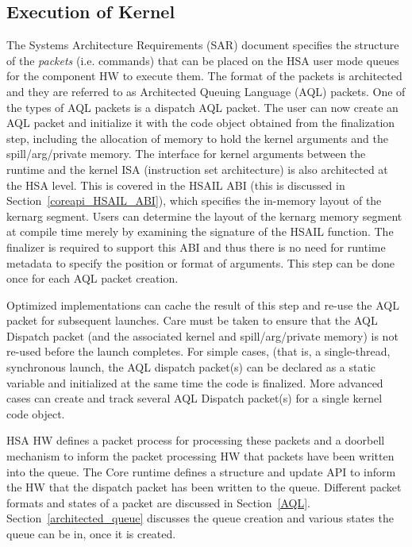 \documentclass{book}
\begin{document}
\subsection{Execution of Kernel}
The Systems Architecture Requirements (SAR) document specifies the
structure of the \emph{packets} (i.e. commands) that can be placed on
the HSA user mode queues for the component HW to execute them. The
format of the packets is architected and they are referred to as
Architected Queuing Language (AQL) packets. One of the types of AQL
packets is a dispatch AQL packet.
The user can now create an AQL packet
and initialize it with the code object obtained from the
finalization step, including the
allocation of memory to hold the kernel arguments and the
spill/arg/private memory.
The interface for kernel arguments between the runtime and the
kernel I\-S\-A (instruction set architecture) is also architected at
the H\-S\-A level. This is covered in the H\-S\-A\-I\-L A\-B\-I
(this is discussed in
Section~\ref{coreapi_HSAIL_ABI}),
which specifies the in-\/memory layout of the kernarg segment. Users
can determine the layout of the kernarg memory segment at compile
time merely by examining the signature of the H\-S\-A\-I\-L
function. The finalizer is required to support this A\-B\-I and thus
there is no need for runtime metadata to specify the position or
format of arguments.
This step can be done once for each A\-Q\-L packet creation.

Optimized implementations can cache the
result of this step and re-\/use the A\-Q\-L packet for subsequent
launches. Care must be taken to ensure that the A\-Q\-L Dispatch
packet (and the associated kernel and spill/arg/private memory) is
not re-\/used before the launch completes. For simple cases, (that
is, a single-\/thread, synchronous launch, the
AQL dispatch packet(s) can be declared as a static variable
and initialized at the same time the code is finalized. More
advanced cases can create and track several
AQL Dispatch packet(s) for a single kernel code object.

HSA HW defines a packet process for processing these packets and a doorbell
mechanism to inform the packet processing HW that packets have been
written into the queue. The Core runtime defines a structure and update
API to inform the HW that the dispatch packet has been written to the
queue. Different packet formats and states of a packet are discussed
in Section~\ref{AQL}. Section~\ref{architected_queue} discusses the
queue creation and various states the queue can be in, once it is
created.
\end{document}
